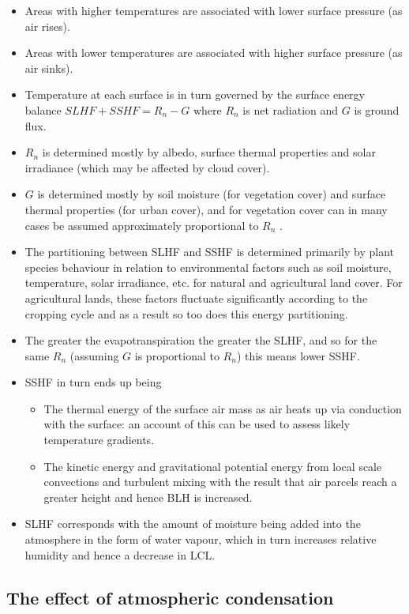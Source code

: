 \begin{itemize}
	\item Areas with higher temperatures are associated with lower surface pressure (as air rises).
	\item Areas with lower temperatures are associated with higher surface pressure (as air sinks).
	\item Temperature at each surface is in turn governed by the surface energy balance $SLHF + SSHF = R_n - G$ where $R_n$ is net radiation and $G$ is ground flux.
	\item $R_n$ is determined mostly by albedo, surface thermal properties and solar irradiance (which may be affected by cloud cover).
	\item $G$ is determined mostly by soil moisture (for vegetation cover) and surface thermal properties (for urban cover), and for vegetation cover can in many cases be assumed approximately proportional to $R_n$ \citep{lyons1996}.
	\item The partitioning between \ac{SLHF} and \ac{SSHF} is determined primarily by plant species behaviour in relation to environmental factors such as soil moisture, temperature, solar irradiance, etc. for natural and agricultural land cover. For agricultural lands, these factors fluctuate significantly according to the cropping cycle and as a result so too does this energy partitioning.
	\item The greater the evapotranspiration the greater the \ac{SLHF}, and so for the same $R_n$ (assuming $G$ is proportional to $R_n$) this means lower \ac{SSHF}.
	\item \ac{SSHF} in turn ends up being
	\begin{itemize}
		\item The thermal energy of the surface air mass as air heats up via conduction with the surface: an account of this can be used to assess likely temperature gradients.
		\item The kinetic energy and gravitational potential energy from local scale convections and turbulent mixing with the result that air parcels reach a greater height and hence \ac{BLH} is increased.
	\end{itemize}
	\item \ac{SLHF} corresponds with the amount of moisture being added into the atmosphere in the form of water vapour, which in turn increases relative humidity and hence a decrease in \ac{LCL}.
\end{itemize}

\subsection{The effect of atmospheric condensation}

